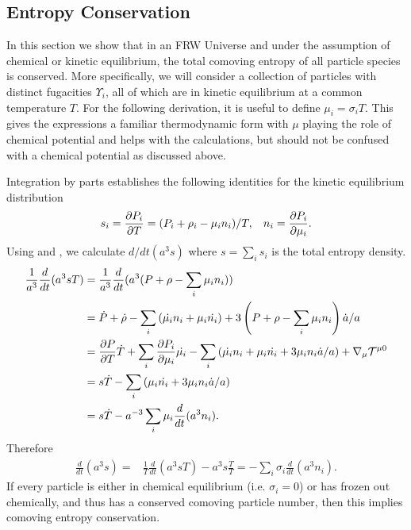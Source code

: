 \subsection{Entropy Conservation}
In this section we show that in an FRW Universe and under the assumption of chemical or kinetic equilibrium, the total comoving entropy of all particle species is conserved. More specifically, we will consider a collection of particles with distinct fugacities $\Upsilon_i$, all of which are in kinetic equilibrium at a common temperature $T$.   For the following derivation, it is useful to define $\mu_i=\sigma_i T$.  This gives the expressions a familiar thermodynamic form with $\mu$ playing the role of chemical potential and helps with the calculations, but should not be confused with a chemical potential as discussed above.  

Integration by parts establishes the following identities for the kinetic equilibrium distribution 
\begin{equation}\label{identities}
s_i=\frac{\partial P_i}{\partial T}=(P_i+\rho_i-\mu_i n_i)/T, \hspace{3mm} n_i=\frac{\partial P_i}{\partial \mu_i}.
\end{equation}
 Using  and , we calculate $d/dt(a^3s)$ where $s=\sum_i s_i$ is the total entropy density.
\begin{align}\frac{1}{a^3}\frac{d}{dt}(a^3sT)&=\frac{1}{a^{3}}\frac{d}{dt}(a^3(P+\rho-\sum_i \mu_i n_i))\\
&=\dot{P}+\dot{\rho}-\sum_i \left(\dot{\mu_i}n_i+\mu_i\dot{n_i}\right)+3\left(P+\rho-\sum_i \mu_i n_i\right)\dot{a}/a\notag\\
&=\frac{\partial P}{\partial T} \dot{T}+\sum_i\frac{\partial P_i}{\partial \mu_i} \dot{\mu_i}-\sum_i \left(\dot{\mu_i}n_i+\mu_i\dot{n_i}+3\mu_i n_i \dot{a}/a\right)+\nabla_\mu \mathcal{T}^{\mu 0}\notag\\
&=s\dot{T}-\sum_i \left(\mu_i\dot{n_i}+3\mu_i n_i \dot{a}/a\right)\notag\\
&=s\dot{T}- a^{-3}\sum_i\mu_i\frac{d}{dt}(a^3n_i).
\end{align}
Therefore
\begin{align}\label{S_n_eq}
\frac{d}{dt}(a^3s)=&\frac{1}{T}\frac{d}{dt}(a^3sT)-a^3s\frac{\dot T}{T}=-\sum_i\sigma_i\frac{d}{dt}(a^3n_i).
\end{align}
If every particle is either in chemical equilibrium (i.e. $\sigma_i= 0$) or has frozen out chemically, and thus has a conserved comoving particle number, then this implies comoving entropy conservation.  


